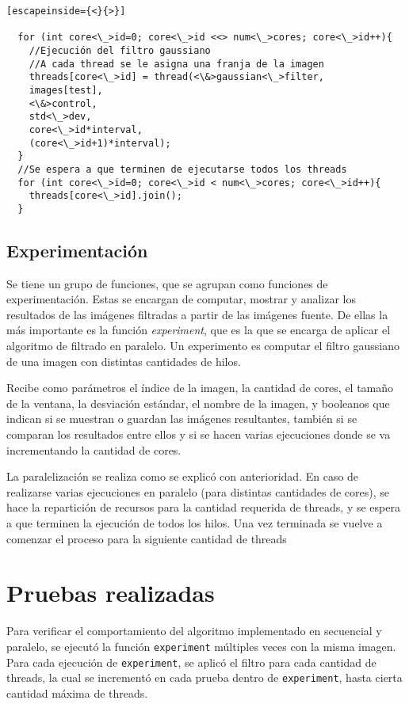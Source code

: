 \documentclass {article}
\begin{document}
\begin{lstlisting}[escapeinside={<}{>}]
  
  for (int core<\_>id=0; core<\_>id <<> num<\_>cores; core<\_>id++){
    //Ejecución del filtro gaussiano
    //A cada thread se le asigna una franja de la imagen
    threads[core<\_>id] = thread(<\&>gaussian<\_>filter,
    images[test],
    <\&>control,
    std<\_>dev,
    core<\_>id*interval,
    (core<\_>id+1)*interval);
  }
  //Se espera a que terminen de ejecutarse todos los threads
  for (int core<\_>id=0; core<\_>id < num<\_>cores; core<\_>id++){
    threads[core<\_>id].join();
  }

\end{lstlisting}


\subsection{Experimentación}

Se tiene un grupo de funciones, que se agrupan como funciones de experimentación. Estas se encargan
de computar, mostrar y analizar los resultados de las imágenes filtradas a partir de las imágenes
fuente. De ellas la más importante es la función \textit{experiment}, que es la que se encarga de
aplicar el algoritmo de filtrado en paralelo. Un experimento es computar el filtro gaussiano de una
imagen con distintas cantidades de hilos. 

Recibe como parámetros el índice de la imagen, la
cantidad de cores, el tamaño de la ventana, la desviación estándar, el nombre de la imagen, y
booleanos que indican si se muestran o guardan las imágenes resultantes, también si se comparan los
resultados entre ellos y si se hacen varias ejecuciones donde se va incrementando la cantidad de
cores.

La paralelización se realiza como se explicó con anterioridad. 
En caso de realizarse varias ejecuciones en paralelo (para distintas cantidades de cores), se hace
la repartición de recursos para la cantidad requerida de threads, y se espera a que terminen la
ejecución de todos los hilos. Una vez terminada se vuelve a comenzar el proceso para la siguiente
cantidad de threads


\section{Pruebas realizadas}
\label{sec:pruebas}
Para verificar el comportamiento del algoritmo implementado en secuencial y paralelo, se ejecutó la
función \texttt{experiment} múltiples veces con la misma imagen. Para cada ejecución de
\texttt{experiment}, se aplicó el filtro para cada cantidad de threads, la cual se incrementó en
cada prueba dentro de \texttt{experiment}, hasta cierta cantidad máxima de threads.
\end{document}
